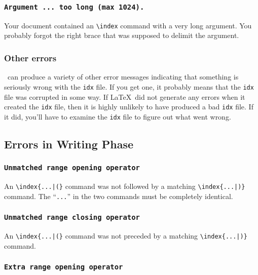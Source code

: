\subsubsection*{\tt Argument ... too long (max 1024).}

Your document contained an \verb|\index| command with a very long
argument.  You probably forgot the right brace that was supposed
to delimit the argument.

\subsubsection*{Other errors}

\MakeIndex\ can produce a variety of other error messages indicating
that something is seriously wrong with the
{\tt idx}%
file.  If you
get one, it probably means that the {\tt idx} file was corrupted in
some way.  If \LaTeX\ did not generate any errors when it created
the {\tt idx} file, then it is highly unlikely to have produced
a bad {\tt idx} file.  If it did, you'll have to examine the
{\tt idx} file to figure out what went wrong.


\subsection{Errors in Writing Phase}

\subsubsection*{\tt Unmatched range opening operator}

An \verb/\index{...|(}/ command was not followed by a matching
  \linebreak%
\verb/\index{...|)}/ command.  The ``\verb|...|'' in the two
commands must be completely identical.


\subsubsection*{\tt Unmatched range closing operator }

An \verb/\index{...|(}/ command was not preceded by a matching
  \linebreak%
\verb/\index{...|)}/ command.

\subsubsection*{\tt Extra range opening operator }

